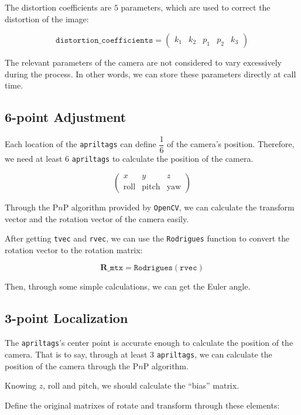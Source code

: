 \documentclass{article}
\begin{document}
The distortion coefficients are $5$ parameters, which are used to correct the distortion of the image:

\[
  \texttt{distortion\_coefficients}=\left(\begin{matrix}
    k_1 & k_2 & p_1 & p_2 & k_3
  \end{matrix}\right)
\]

The relevant parameters of the camera are not considered to vary excessively during the process. In other words, we can store these parameters directly at call time.

\subsection{6-point Adjustment}
Each location of the \texttt{apriltags} can define $\dfrac16$ of the camera's position. Therefore, we need at least $6$ \texttt{apriltags} to calculate the position of the camera.

\[
  \left(
    \begin{matrix}
      x&y&z\\
      \mathrm{roll}&\mathrm{pitch}&\mathrm{yaw}
    \end{matrix}
  \right)
\]

Through the P$n$P algorithm provided by \texttt{OpenCV}, we can calculate the transform vector and the rotation vector of the camera easily.

After getting \texttt{tvec} and \texttt{rvec}, we can use the \texttt{Rodrigues} function to convert the rotation vector to the rotation matrix:

\[
  \boldsymbol{R}\_\texttt{mtx}=\texttt{Rodrigues}\left(\texttt{rvec}\right)
\]

Then, through some simple calculations, we can get the Euler angle.

\subsection{3-point Localization}
The \texttt{apriltags}'s center point is accurate enough to calculate the position of the camera. That is to say, through at least $3$ \texttt{apriltags}, we can calculate the position of the camera through the P$n$P algorithm.

Knowing $z$, $\mathrm{roll}$ and $\mathrm{pitch}$, we should calculate the ``bias'' matrix.

Define the original matrixes of rotate and transform through these elements:
\end{document}
